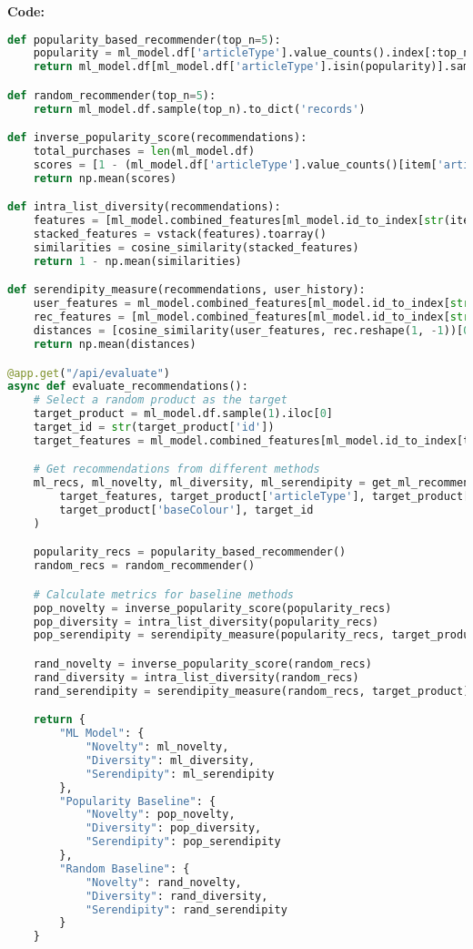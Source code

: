 \documentclass[12pt,a4paper]{article}
\begin{document}
\textbf{Code:}
\begin{lstlisting}[language=Python]
def popularity_based_recommender(top_n=5):
    popularity = ml_model.df['articleType'].value_counts().index[:top_n]
    return ml_model.df[ml_model.df['articleType'].isin(popularity)].sample(top_n).to_dict('records')

def random_recommender(top_n=5):
    return ml_model.df.sample(top_n).to_dict('records')

def inverse_popularity_score(recommendations):
    total_purchases = len(ml_model.df)
    scores = [1 - (ml_model.df['articleType'].value_counts()[item['articleType']] / total_purchases) for item in recommendations]
    return np.mean(scores)

def intra_list_diversity(recommendations):
    features = [ml_model.combined_features[ml_model.id_to_index[str(item['id'])]] for item in recommendations]
    stacked_features = vstack(features).toarray()
    similarities = cosine_similarity(stacked_features)
    return 1 - np.mean(similarities)

def serendipity_measure(recommendations, user_history):
    user_features = ml_model.combined_features[ml_model.id_to_index[str(user_history['id'])]]
    rec_features = [ml_model.combined_features[ml_model.id_to_index[str(item['id'])]] for item in recommendations]
    distances = [cosine_similarity(user_features, rec.reshape(1, -1))[0][0] for rec in rec_features]
    return np.mean(distances)

@app.get("/api/evaluate")
async def evaluate_recommendations():
    # Select a random product as the target
    target_product = ml_model.df.sample(1).iloc[0]
    target_id = str(target_product['id'])
    target_features = ml_model.combined_features[ml_model.id_to_index[target_id]]

    # Get recommendations from different methods
    ml_recs, ml_novelty, ml_diversity, ml_serendipity = get_ml_recommendations(
        target_features, target_product['articleType'], target_product['gender'],
        target_product['baseColour'], target_id
    )

    popularity_recs = popularity_based_recommender()
    random_recs = random_recommender()

    # Calculate metrics for baseline methods
    pop_novelty = inverse_popularity_score(popularity_recs)
    pop_diversity = intra_list_diversity(popularity_recs)
    pop_serendipity = serendipity_measure(popularity_recs, target_product)

    rand_novelty = inverse_popularity_score(random_recs)
    rand_diversity = intra_list_diversity(random_recs)
    rand_serendipity = serendipity_measure(random_recs, target_product)

    return {
        "ML Model": {
            "Novelty": ml_novelty,
            "Diversity": ml_diversity,
            "Serendipity": ml_serendipity
        },
        "Popularity Baseline": {
            "Novelty": pop_novelty,
            "Diversity": pop_diversity,
            "Serendipity": pop_serendipity
        },
        "Random Baseline": {
            "Novelty": rand_novelty,
            "Diversity": rand_diversity,
            "Serendipity": rand_serendipity
        }
    }
\end{lstlisting}
\end{document}
